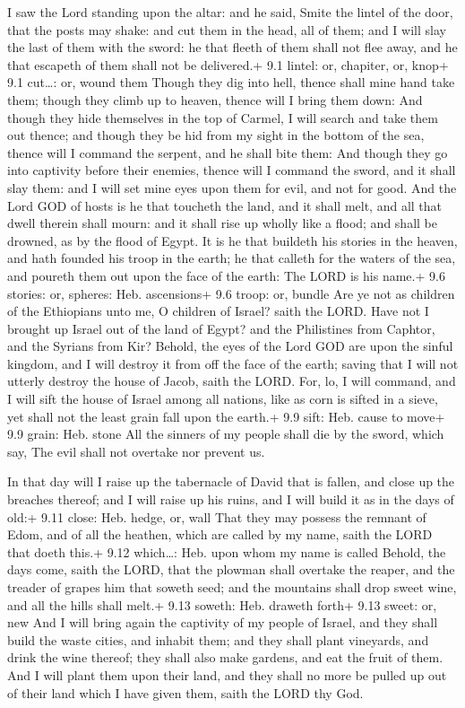 I saw the Lord standing upon the altar: and he said, Smite
the lintel of the door, that the posts may shake: and cut them in the
head, all of them; and I will slay the last of them with the sword: he
that fleeth of them shall not flee away, and he that escapeth of them
shall not be delivered.+ 9.1 lintel: or, chapiter, or, knop+ 9.1
cut\ldots: or, wound them  Though they dig into hell, thence
shall mine hand take them; though they climb up to heaven, thence will I
bring them down:  And though they hide themselves in the top
of Carmel, I will search and take them out thence; and though they be
hid from my sight in the bottom of the sea, thence will I command the
serpent, and he shall bite them:  And though they go into
captivity before their enemies, thence will I command the sword, and it
shall slay them: and I will set mine eyes upon them for evil, and not
for good.  And the Lord GOD of hosts is he that toucheth the
land, and it shall melt, and all that dwell therein shall mourn: and it
shall rise up wholly like a flood; and shall be drowned, as by the flood
of Egypt.  It is he that buildeth his stories in the heaven,
and hath founded his troop in the earth; he that calleth for the waters
of the sea, and poureth them out upon the face of the earth: The LORD is
his name.+ 9.6 stories: or, spheres: Heb. ascensions+ 9.6 troop: or,
bundle  Are ye not as children of the Ethiopians unto me, O
children of Israel? saith the LORD. Have not I brought up Israel out of
the land of Egypt? and the Philistines from Caphtor, and the Syrians
from Kir?  Behold, the eyes of the Lord GOD are upon the
sinful kingdom, and I will destroy it from off the face of the earth;
saving that I will not utterly destroy the house of Jacob, saith the
LORD.  For, lo, I will command, and I will sift the house of
Israel among all nations, like as corn is sifted in a sieve, yet shall
not the least grain fall upon the earth.+ 9.9 sift: Heb. cause to move+
9.9 grain: Heb. stone  All the sinners of my people shall
die by the sword, which say, The evil shall not overtake nor prevent us.

 In that day will I raise up the tabernacle of David that
is fallen, and close up the breaches thereof; and I will raise up his
ruins, and I will build it as in the days of old:+ 9.11 close: Heb.
hedge, or, wall  That they may possess the remnant of Edom,
and of all the heathen, which are called by my name, saith the LORD that
doeth this.+ 9.12 which\ldots: Heb. upon whom my name is called
 Behold, the days come, saith the LORD, that the plowman
shall overtake the reaper, and the treader of grapes him that soweth
seed; and the mountains shall drop sweet wine, and all the hills shall
melt.+ 9.13 soweth: Heb. draweth forth+ 9.13 sweet: or, new
 And I will bring again the captivity of my people of
Israel, and they shall build the waste cities, and inhabit them; and
they shall plant vineyards, and drink the wine thereof; they shall also
make gardens, and eat the fruit of them.  And I will plant
them upon their land, and they shall no more be pulled up out of their
land which I have given them, saith the LORD thy God.
